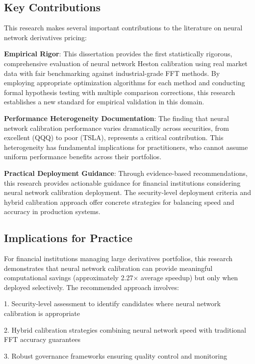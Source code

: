 \documentclass[12pt,a4paper]{article}
\begin{document}
\subsection{Key Contributions}

This research makes several important contributions to the literature on neural network derivatives pricing:

\textbf{Empirical Rigor}: This dissertation provides the first statistically rigorous, comprehensive evaluation of neural network Heston calibration using real market data with fair benchmarking against industrial-grade FFT methods. By employing appropriate optimization algorithms for each method and conducting formal hypothesis testing with multiple comparison corrections, this research establishes a new standard for empirical validation in this domain.

\textbf{Performance Heterogeneity Documentation}: The finding that neural network calibration performance varies dramatically across securities, from excellent (QQQ) to poor (TSLA), represents a critical contribution. This heterogeneity has fundamental implications for practitioners, who cannot assume uniform performance benefits across their portfolios.

\textbf{Practical Deployment Guidance}: Through evidence-based recommendations, this research provides actionable guidance for financial institutions considering neural network calibration deployment. The security-level deployment criteria and hybrid calibration approach offer concrete strategies for balancing speed and accuracy in production systems.

\subsection{Implications for Practice}

For financial institutions managing large derivatives portfolios, this research demonstrates that neural network calibration can provide meaningful computational savings (approximately 2.27$\times$ average speedup) but only when deployed selectively. The recommended approach involves:

1. Security-level assessment to identify candidates where neural network calibration is appropriate

2. Hybrid calibration strategies combining neural network speed with traditional FFT accuracy guarantees

3. Robust governance frameworks ensuring quality control and monitoring
\end{document}
